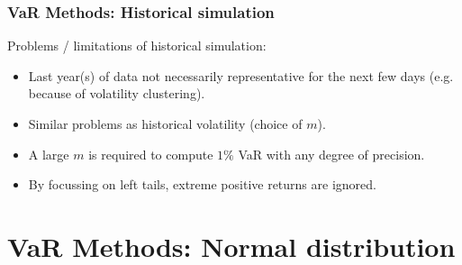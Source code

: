 \begin{frame}%

\frametitle{VaR Methods: Historical simulation}

Problems / limitations of historical simulation:

\begin{itemize}
\item Last year(s) of data not necessarily representative for the next few
days (e.g. because of volatility clustering).

\item Similar problems as historical volatility (choice of $m$).

\item A large $m$ is required to compute $1\%$ VaR with any degree of
precision.

\item By focussing on left tails, extreme positive returns are ignored.
\end{itemize}

\end{frame}%

\section[Normal Distribution]{VaR Methods: Normal distribution}\subsection*{}

